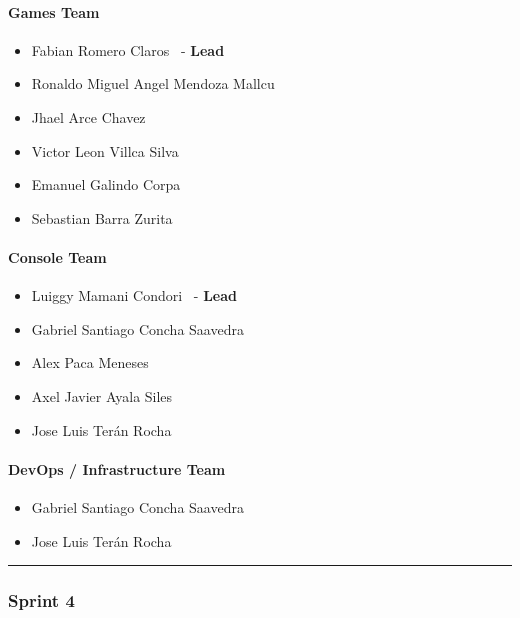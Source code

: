 \paragraph{Games Team}\label{games-team-3}

\begin{itemize}
\tightlist
\item
  Fabian Romero Claros ~-
  \textbf{Lead}
\item
  Ronaldo Miguel Angel Mendoza Mallcu
\item
  Jhael Arce Chavez
\item
  Victor Leon Villca Silva
\item
  Emanuel Galindo Corpa
\item
  Sebastian Barra Zurita
\end{itemize}

\paragraph{Console Team}\label{console-team-3}

\begin{itemize}
\tightlist
\item
  Luiggy Mamani Condori ~- \textbf{Lead}
\item
  Gabriel Santiago Concha Saavedra
\item
  Alex Paca Meneses
\item
  Axel Javier Ayala Siles
\item
  Jose Luis Terán Rocha
\end{itemize}

\paragraph{DevOps / Infrastructure Team}\label{devops-team-3}

\begin{itemize}
\tightlist
\item
  Gabriel Santiago Concha Saavedra
\item
  Jose Luis Terán Rocha
\end{itemize}

\begin{center}\rule{0.5\linewidth}{0.5pt}\end{center}

\hypertarget{sprint4}{
\subsubsection{\texorpdfstring{\textbf{Sprint
4}}{Sprint 4}}\label{sprint4}}

